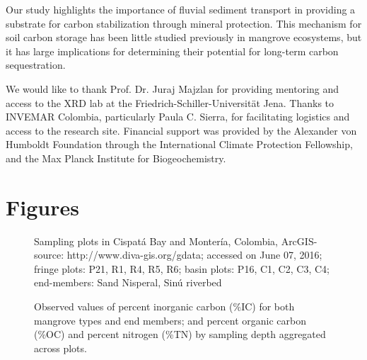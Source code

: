 Our study highlights the importance of fluvial sediment transport in providing a substrate for carbon stabilization through mineral protection. This mechanism for soil carbon storage has been little studied previously in mangrove ecosystems, but it has large implications for determining their potential for long-term carbon sequestration. 

%



\begin{acknowledgements}
We would like to thank Prof. Dr. Juraj Majzlan for providing mentoring and access to the XRD lab at the Friedrich-Schiller-Universit\"at Jena. Thanks to INVEMAR Colombia, particularly Paula C. Sierra, for facilitating logistics and access to the research site. Financial support was provided by the Alexander von Humboldt Foundation through the International Climate Protection Fellowship, and the Max Planck Institute for Biogeochemistry.
\end{acknowledgements}

\clearpage

\section*{Figures}

\begin{figure}[H]
\centering
\caption{Sampling plots in Cispat\'{a} Bay and Monter\'{i}a, Colombia, ArcGIS-source: http://www.diva-gis.org/gdata; accessed on June 07, 2016; fringe plots: P21, R1, R4, R5, R6; basin plots: P16, C1, C2, C3, C4; end-members: Sand Nisperal, Sin\'{u} riverbed}
\label{fig:1}       %
\end{figure}

\begin{figure}[H]
\caption{Observed values of percent inorganic carbon (\%IC) for both mangrove types and end members; and percent organic carbon (\%OC) and percent nitrogen (\%TN) by sampling depth aggregated across plots. }
\label{fig:2}       %
\end{figure}

